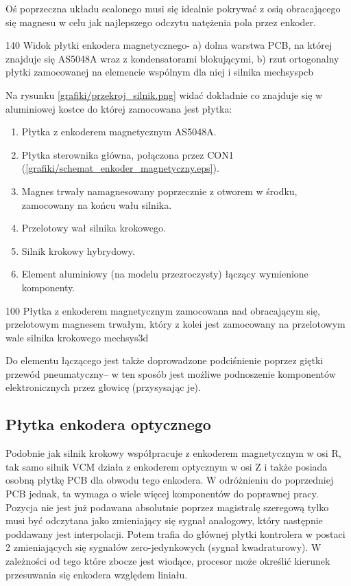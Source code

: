 Oś poprzeczna układu scalonego musi się idealnie pokrywać z osią obracającego się magnesu w celu jak najlepszego odczytu natężenia pola przez enkoder.

	{140}
	{Widok płytki enkodera magnetycznego- a) dolna warstwa PCB, na której znajduje się AS5048A wraz z kondensatorami blokującymi, b) rzut ortogonalny płytki zamocowanej na elemencie wspólnym dla niej i silnika}
	{mechsyspcb}
	
Na rysunku \ref{grafiki/przekroj_silnik.png} widać dokładnie co znajduje się w aluminiowej kostce do której zamocowana jest płytka:

\begin{enumerate}
	\item Płytka z enkoderem magnetycznym AS5048A.
	\item Płytka sterownika główna, połączona przez CON1 (\ref{grafiki/schemat_enkoder_magnetyczny.eps}).
	\item Magnes trwały namagnesowany poprzecznie z otworem w środku, zamocowany na końcu wału silnika.
	\item Przelotowy wał silnika krokowego.
	\item Silnik krokowy hybrydowy.
	\item Element aluminiowy (na modelu przezroczysty) łączący wymienione komponenty.
\end{enumerate}
	
	{100}
	{Płytka z enkoderem magnetycznym zamocowana nad obracającym się, przelotowym magnesem trwałym, który z kolei jest zamocowany na przelotowym wale silnika krokowego}
	{mechsys3d}
	
Do elementu łączącego jest także doprowadzone podciśnienie poprzez giętki przewód pneumatyczny-- w ten sposób jest możliwe podnoszenie komponentów elektronicznych przez głowicę (przysysając je).
	
\subsection{Płytka enkodera optycznego}
\label{ss:encopt}

Podobnie jak silnik krokowy współpracuje z enkoderem magnetycznym w osi R, tak samo silnik VCM działa z enkoderem optycznym w osi Z i także posiada osobną płytkę PCB dla obwodu tego enkodera. W odróżnieniu do poprzedniej PCB jednak, ta wymaga o wiele więcej komponentów do poprawnej pracy. Pozycja nie jest już podawana absolutnie poprzez magistralę szeregową tylko musi być odczytana jako zmieniający się sygnał analogowy, który następnie poddawany jest interpolacji. Potem trafia do głównej płytki kontrolera w postaci 2 zmieniających się sygnałów zero-jedynkowych (sygnał kwadraturowy). W zależności od tego które zbocze jest wiodące, procesor może określić kierunek przesuwania się enkodera względem liniału. \\

